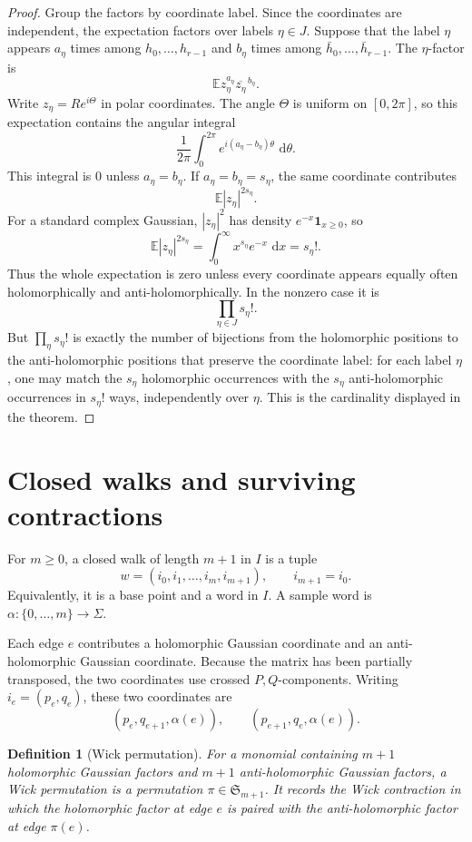 \documentclass[11pt,oneside]{book}
\newtheorem{definition}[theorem]{Definition}
\newcommand{\E}{\mathbb E}
\newcommand{\1}{\mathbf 1}
\newcommand{\dd}{\,\mathrm d}
\begin{document}
\begin{proof}
Group the factors by coordinate label.  Since the coordinates are
independent, the expectation factors over labels \(\eta\in J\).  Suppose that
the label \(\eta\) appears \(a_\eta\) times among
\(h_0,\ldots,h_{r-1}\) and \(b_\eta\) times among
\(\bar h_0,\ldots,\bar h_{r-1}\).  The \(\eta\)-factor is
\[
  \E z_\eta^{a_\eta}\overline{z_\eta}^{\,b_\eta}.
\]
Write \(z_\eta=Re^{i\Theta}\) in polar coordinates.  The angle \(\Theta\) is
uniform on \([0,2\pi]\), so this expectation contains the angular integral
\[
  \frac1{2\pi}\int_0^{2\pi} e^{i(a_\eta-b_\eta)\theta}\,\dd\theta.
\]
This integral is \(0\) unless \(a_\eta=b_\eta\).  If
\(a_\eta=b_\eta=s_\eta\), the same coordinate contributes
\[
  \E |z_\eta|^{2s_\eta}.
\]
For a standard complex Gaussian, \(|z_\eta|^2\) has density \(e^{-x}\1_{x\ge0}\),
so
\[
  \E |z_\eta|^{2s_\eta}
  =
  \int_0^\infty x^{s_\eta}e^{-x}\,\dd x
  =
  s_\eta!.
\]
Thus the whole expectation is zero unless every coordinate appears equally
often holomorphically and anti-holomorphically.  In the nonzero case it is
\[
  \prod_{\eta\in J}s_\eta!.
\]
But \(\prod_\eta s_\eta!\) is exactly the number of bijections from the
holomorphic positions to the anti-holomorphic positions that preserve the
coordinate label: for each label \(\eta\), one may match the
\(s_\eta\) holomorphic occurrences with the \(s_\eta\) anti-holomorphic
occurrences in \(s_\eta!\) ways, independently over \(\eta\).  This is the
cardinality displayed in the theorem.
\end{proof}

\section{Closed walks and surviving contractions}

For \(m\ge0\), a closed walk of length \(m+1\) in \(I\) is a tuple
\[
  w=(i_0,i_1,\ldots,i_m,i_{m+1}),\qquad i_{m+1}=i_0.
\]
Equivalently, it is a base point and a word in \(I\).  A sample word is
\(\alpha:\{0,\ldots,m\}\to\Sigma\).

Each edge \(e\) contributes a holomorphic Gaussian coordinate and an
anti-holomorphic Gaussian coordinate.  Because the matrix has been partially
transposed, the two coordinates use crossed \(P,Q\)-components.
Writing \(i_e=(p_e,q_e)\), these two coordinates are
\[
  (p_e,q_{e+1},\alpha(e)),
  \qquad
  (p_{e+1},q_e,\alpha(e)).
\]

\begin{definition}[Wick permutation]
For a monomial containing \(m+1\) holomorphic Gaussian factors and \(m+1\)
anti-holomorphic Gaussian factors, a Wick permutation is a permutation
\(\pi\in\mathfrak S_{m+1}\).  It records the Wick contraction in which the
holomorphic factor at edge \(e\) is paired with the anti-holomorphic factor at
edge \(\pi(e)\).
\end{definition}
\end{document}
